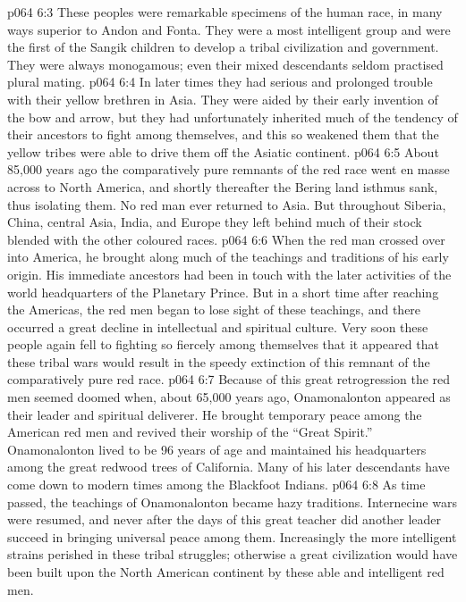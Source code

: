 \vs p064 6:3 \bibnobreakspace {} These peoples were remarkable specimens of the human race, in many ways superior to Andon and Fonta. They were a most intelligent group and were the first of the Sangik children to develop a tribal civilization and government. They were always monogamous; even their mixed descendants seldom practised plural mating.
\vs p064 6:4 In later times they had serious and prolonged trouble with their yellow brethren in Asia. They were aided by their early invention of the bow and arrow, but they had unfortunately inherited much of the tendency of their ancestors to fight among themselves, and this so weakened them that the yellow tribes were able to drive them off the Asiatic continent.
\vs p064 6:5 About 85,000 years ago the comparatively pure remnants of the red race went en masse across to North America, and shortly thereafter the Bering land isthmus sank, thus isolating them. No red man ever returned to Asia. But throughout Siberia, China, central Asia, India, and Europe they left behind much of their stock blended with the other coloured races.
\vs p064 6:6 When the red man crossed over into America, he brought along much of the teachings and traditions of his early origin. His immediate ancestors had been in touch with the later activities of the world headquarters of the Planetary Prince. But in a short time after reaching the Americas, the red men began to lose sight of these teachings, and there occurred a great decline in intellectual and spiritual culture. Very soon these people again fell to fighting so fiercely among themselves that it appeared that these tribal wars would result in the speedy extinction of this remnant of the comparatively pure red race.
\vs p064 6:7 Because of this great retrogression the red men seemed doomed when, about 65,000 years ago, Onamonalonton appeared as their leader and spiritual deliverer. He brought temporary peace among the American red men and revived their worship of the “Great Spirit.” Onamonalonton lived to be 96 years of age and maintained his headquarters among the great redwood trees of California. Many of his later descendants have come down to modern times among the Blackfoot Indians.
\vs p064 6:8 As time passed, the teachings of Onamonalonton became hazy traditions. Internecine wars were resumed, and never after the days of this great teacher did another leader succeed in bringing universal peace among them. Increasingly the more intelligent strains perished in these tribal struggles; otherwise a great civilization would have been built upon the North American continent by these able and intelligent red men.
